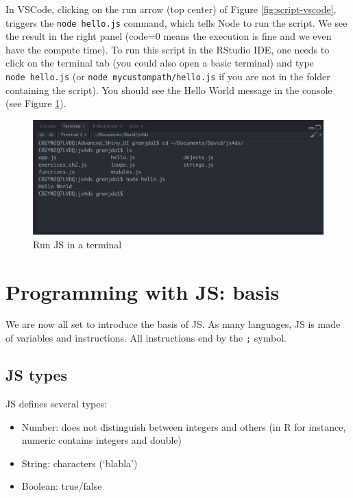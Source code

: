 \documentclass[]{book}
\providecommand{\tightlist}{%
  \setlength{\itemsep}{0pt}\setlength{\parskip}{0pt}}
\begin{document}
In VSCode, clicking on the run arrow (top center) of Figure \ref{fig:script-vscode}, triggers the \texttt{node\ hello.js} command, which tells Node to run the script. We see the result in the right panel (code=0 means the execution is fine and we even have the compute time). To run this script in the RStudio IDE, one needs to click on the terminal tab (you could also open a basic terminal) and type \texttt{node\ hello.js} (or \texttt{node\ mycustompath/hello.js} if you are not in the folder containing the script). You should see the Hello World message in the console (see Figure \ref{fig:script-rstudio}).

\begin{figure}
\includegraphics[width=26.75in]{images/survival-kit/script-rstudio} \caption{Run JS in a terminal}\label{fig:script-rstudio}
\end{figure}

\hypertarget{programming-with-js-basis}{%
\section{Programming with JS: basis}\label{programming-with-js-basis}}

We are now all set to introduce the basis of JS. As many languages, JS is made of variables and instructions. All instructions end by the \texttt{;} symbol.

\hypertarget{js-types}{%
\subsection{JS types}\label{js-types}}

JS defines several types:

\begin{itemize}
\tightlist
\item
  Number: does not distinguish between integers and others (in R for instance, numeric contains integers and double)
\item
  String: characters (`blabla')
\item
  Boolean: true/false
\end{itemize}
\end{document}
